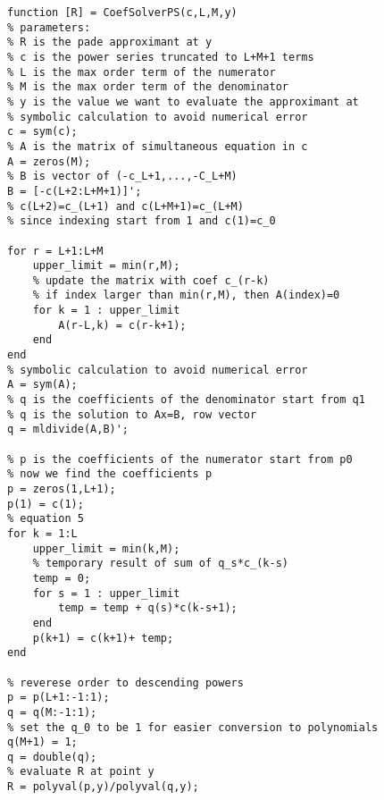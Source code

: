 \lstset{basicstyle=\footnotesize,style=myCustomMatlabStyle}
\begin{lstlisting}
function [R] = CoefSolverPS(c,L,M,y)
% parameters:
% R is the pade approximant at y
% c is the power series truncated to L+M+1 terms
% L is the max order term of the numerator
% M is the max order term of the denominator
% y is the value we want to evaluate the approximant at
% symbolic calculation to avoid numerical error
c = sym(c);
% A is the matrix of simultaneous equation in c
A = zeros(M);
% B is vector of (-c_L+1,...,-C_L+M) 
B = [-c(L+2:L+M+1)]';    
% c(L+2)=c_(L+1) and c(L+M+1)=c_(L+M)
% since indexing start from 1 and c(1)=c_0

for r = L+1:L+M
    upper_limit = min(r,M);
    % update the matrix with coef c_(r-k)
    % if index larger than min(r,M), then A(index)=0
    for k = 1 : upper_limit
        A(r-L,k) = c(r-k+1);
    end
end
% symbolic calculation to avoid numerical error
A = sym(A);
% q is the coefficients of the denominator start from q1
% q is the solution to Ax=B, row vector
q = mldivide(A,B)';

% p is the coefficients of the numerator start from p0
% now we find the coefficients p
p = zeros(1,L+1);
p(1) = c(1);
% equation 5
for k = 1:L
    upper_limit = min(k,M);
    % temporary result of sum of q_s*c_(k-s)
    temp = 0;
    for s = 1 : upper_limit
        temp = temp + q(s)*c(k-s+1);
    end
    p(k+1) = c(k+1)+ temp;
end

% reverese order to descending powers
p = p(L+1:-1:1);
q = q(M:-1:1);
% set the q_0 to be 1 for easier conversion to polynomials
q(M+1) = 1;
q = double(q);
% evaluate R at point y
R = polyval(p,y)/polyval(q,y);

\end{lstlisting}